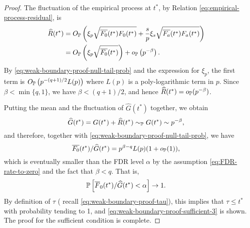 \begin{proof}
The fluctuation of the empirical process at $t^*$, by Relation \eqref{eq:empirical-process-residual}, is 
\begin{align*}
    \widehat{R}(t^*) 
    &= O_\P\left(\xi_p\sqrt{\overline{F_0}(t^*)F_0(t^*)} + \frac{s}{p}\xi_s\sqrt{\overline{F_a}(t^*)F_a(t^*)}\right)\\
    &= O_\P\left(\xi_p\sqrt{\overline{F_0}(t^*)}\right) + o_\P\left(p^{-\beta}\right).
\end{align*}
By \eqref{eq:weak-boundary-proof-null-tail-prob} and the expression for $\xi_p$, the first term is $O_\P\left(p^{-(q+1)/2}L(p)\right)$ where $L(p)$ is a poly-logarithmic term in $p$.
Since $\beta<\min\{q,1\}$, we have $\beta<(q+1)/2$, and hence $\widehat{R}(t^*) = o_\P(p^{-\beta})$.

Putting the mean and the fluctuation of $\widehat{G}(t^*)$ together, we obtain
$$
\widehat{G}(t^*) = G(t^*) + \widehat{R}(t^*) \sim_\P G(t^*) \sim p^{-\beta},
$$
and therefore, together with \eqref{eq:weak-boundary-proof-null-tail-prob}, we have
$$
\overline{F_0}(t^*)/\widehat{G}(t^*) = p^{\beta-q}L(p)(1+o_{\P}(1)),
$$
which is eventually smaller than the FDR level $\alpha$ by the assumption \eqref{eq:FDR-rate-to-zero} and the fact that $\beta<q$.
That is, 
$$
\P\left[\overline{F}_0(t^*) / \widehat{G}(t^*) < \alpha\right] \to 1.
$$
By definition of $\tau$ ( recall \eqref{eq:weak-boundary-proof-tau}), this implies that $\tau \le t^*$ with probability tending to 1, and \eqref{eq:weak-boundary-proof-sufficient-3} is shown.
The proof for the sufficient condition is complete.
\end{proof}